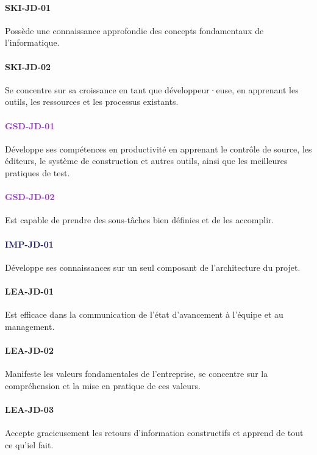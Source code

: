 \documentclass[a4paper, french, openany, 12pt]{book}
\newcommand\dex[1]{\textcolor{BrickRed}{\textbf{\uppercase{ski-{#1}}}}}
\newcommand\str[1]{\textcolor{DarkOrchid}{\textbf{\uppercase{gsd-{#1}}}}}
\newcommand\wis[1]{\textcolor{MidnightBlue}{\textbf{\uppercase{imp-{#1}}}}}
\newcommand\cha[1]{\textcolor{OliveGreen}{\textbf{\uppercase{lea-{#1}}}}}
\newcommand\dev{développeur·euse}
\begin{document}
\begin{multicols}{2}

  \paragraph{\dex{jd-01}} 

  Possède une connaissance approfondie des concepts fondamentaux de l'informatique.

  \paragraph{\dex{jd-02}} 

  Se concentre sur sa croissance en tant que \dev, en apprenant les outils, les ressources et les processus 
  existants.

  \paragraph{\str{jd-01}}

  Développe ses compétences en productivité en apprenant le contrôle de source, les éditeurs, le système de construction 
  et autres outils, ainsi que les meilleures pratiques de test.

  \paragraph{\str{jd-02}}

  Est capable de prendre des sous-tâches bien définies et de les accomplir.

  \paragraph{\wis{jd-01}}

  Développe ses connaissances sur un seul composant de l'architecture du projet.

  \paragraph{\cha{jd-01}}

  Est efficace dans la communication de l'état d'avancement à l'équipe et au management.

  \paragraph{\cha{jd-02}}

  Manifeste les valeurs fondamentales de l'entreprise, se concentre sur la compréhension et la mise en pratique de ces 
  valeurs.

  \paragraph{\cha{jd-03}}

  Accepte gracieusement les retours d'information constructifs et apprend de tout ce qu'iel fait.
\end{multicols}
\end{document}
